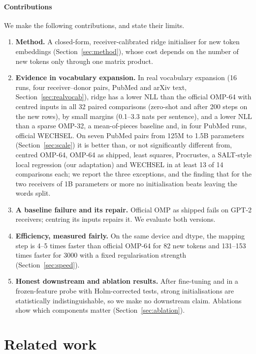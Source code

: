 \documentclass[preprint,12pt]{elsarticle}
\begin{document}
\paragraph{Contributions} We make the following contributions, and state their limits.
\begin{enumerate}
\item \textbf{Method.} A closed-form, receiver-calibrated ridge initialiser for new token embeddings (Section~\ref{sec:method}), whose cost depends on the number of new tokens only through one matrix product.
\item \textbf{Evidence in vocabulary expansion.} In real vocabulary expansion (16 runs, four receiver--donor pairs, PubMed and arXiv text, Section~\ref{sec:realvocab}), ridge has a lower NLL than the official OMP-64 with centred inputs in all 32 paired comparisons (zero-shot and after 200 steps on the new rows), by small margins (0.1--3.3 nats per sentence), and a lower NLL than a sparse OMP-32, a mean-of-pieces baseline and, in four PubMed runs, official WECHSEL. On seven PubMed pairs from 125M to 1.5B parameters (Section~\ref{sec:scale}) it is better than, or not significantly different from, centred OMP-64, OMP-64 as shipped, least squares, Procrustes, a SALT-style local regression (our adaptation) and WECHSEL in at least 13 of 14 comparisons each; we report the three exceptions, and the finding that for the two receivers of 1B parameters or more no initialisation beats leaving the words split.
\item \textbf{A baseline failure and its repair.} Official OMP as shipped fails on GPT-2 receivers; centring its inputs repairs it. We evaluate both versions.
\item \textbf{Efficiency, measured fairly.} On the same device and dtype, the mapping step is 4--5 times faster than official OMP-64 for 82 new tokens and 131--153 times faster for 3000 with a fixed regularisation strength (Section~\ref{sec:speed}).
\item \textbf{Honest downstream and ablation results.} After fine-tuning and in a frozen-feature probe with Holm-corrected tests, strong initialisations are statistically indistinguishable, so we make no downstream claim. Ablations show which components matter (Section~\ref{sec:ablation}).
\end{enumerate}

\section{Related work}
\label{sec:related}
\end{document}
